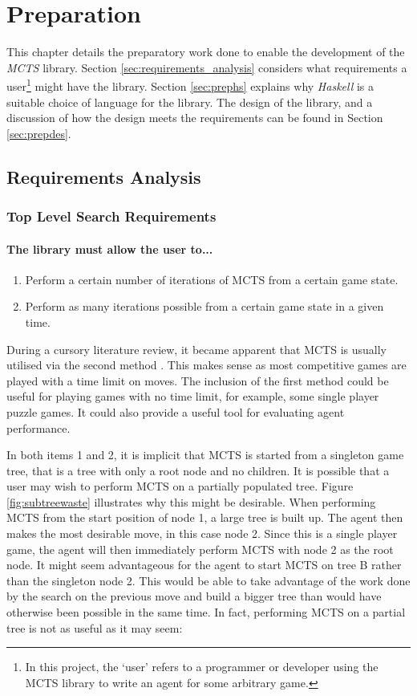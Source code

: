 \chapter{Preparation}
This chapter details the preparatory work done to enable the development of the \textit{MCTS} library. Section \ref{sec:requirements_analysis} considers what requirements a user\footnote{In this project, the `user' refers to a programmer or developer using the {MCTS} library to write an agent for some arbitrary game.} might have the library. Section \ref{sec:prephs} explains why \textit{Haskell} is a suitable choice of language for the library. The design of the library, and a discussion of how the design meets the requirements can be found in Section \ref{sec:prepdes}.

\section{Requirements Analysis \label{sec:requirements_analysis}}
\subsection{Top Level Search Requirements}
\subsubsection{The library must allow the user to...}
\begin{enumerate}
\item Perform a certain number of iterations of {MCTS} from a certain game state.\par
\item Perform as many iterations possible from a certain game state in a given time.\par

\end{enumerate}

During a cursory literature review, it became apparent that {MCTS} is usually utilised via the second method \cite{go,kriegspiel,connect6}. This makes sense as most competitive games are played with a time limit on moves. The inclusion of the first method could be useful for playing games with no time limit, for example, some single player puzzle games. It could also provide a useful tool for evaluating agent performance.

In both items 1 and 2, it is implicit that {MCTS} is started from a singleton game tree, that is a tree with only a root node and no children. It is possible that a user may wish to perform MCTS on a partially populated tree.  
Figure \ref{fig:subtreewaste} illustrates why this might be desirable. When performing {MCTS} from the start position of node 1, a large tree is built up. The agent then makes the most desirable move, in this case node 2. Since this is a single player game, the agent will then immediately perform {MCTS} with node 2 as the root node. It might seem advantageous for the agent to start {MCTS} on tree B rather than the singleton node 2. This would be able to take advantage of the work done by the search on the previous move and build a bigger tree than would have otherwise been possible in the same time. In fact, performing MCTS on a partial tree is not as useful as it may seem:

